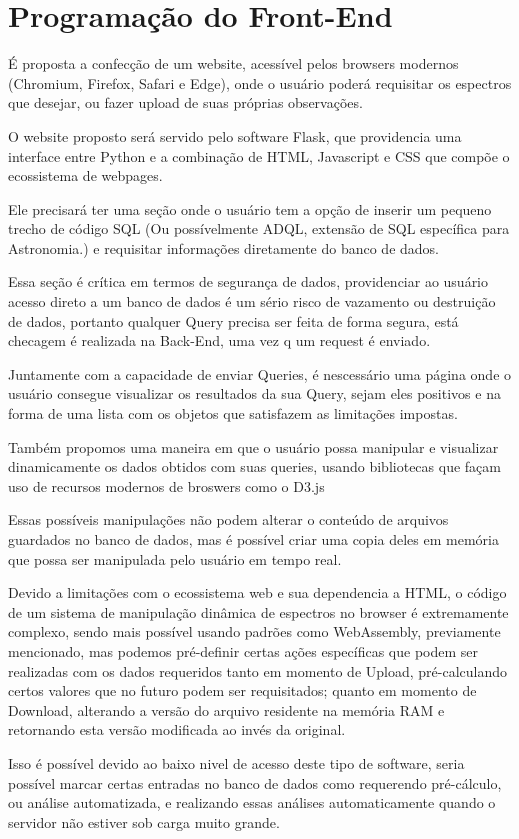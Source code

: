 \section{Programação do Front-End}

É proposta a confecção de um website, acessível pelos browsers modernos (Chromium, Firefox, Safari e Edge), onde o usuário poderá requisitar os espectros que desejar, ou fazer upload de suas próprias observações.

O website proposto será servido pelo software Flask, que providencia uma interface entre Python e a combinação de HTML, Javascript e CSS que compõe o ecossistema de webpages.

Ele precisará ter uma seção onde o usuário tem a opção de inserir um pequeno trecho de código SQL (Ou possívelmente ADQL, extensão de SQL específica para Astronomia.) e requisitar informações diretamente do banco de dados.

Essa seção é crítica em termos de segurança de dados, providenciar ao usuário acesso direto a um banco de dados é um sério risco de vazamento ou destruição de dados, portanto qualquer Query precisa ser feita de forma segura, está checagem é realizada na Back-End, uma vez q um request é enviado.

Juntamente com a capacidade de enviar Queries, é nescessário uma página onde o usuário consegue visualizar os resultados da sua Query, sejam eles positivos e na forma de uma lista com os objetos que satisfazem as limitações impostas.

Também propomos uma maneira em que o usuário possa manipular e visualizar dinamicamente os dados obtidos com suas queries, usando bibliotecas que façam uso de recursos modernos de broswers como o D3.js

Essas possíveis manipulações não podem alterar o conteúdo de arquivos guardados no banco de dados, mas é possível criar uma copia deles em memória que possa ser manipulada pelo usuário em tempo real.

Devido a limitações com o ecossistema web e sua dependencia a HTML, o código de um sistema de manipulação dinâmica de espectros no browser é extremamente complexo, sendo mais possível usando padrões como WebAssembly, previamente mencionado, mas podemos pré-definir certas ações específicas que podem ser realizadas com os dados requeridos tanto em momento de Upload, pré-calculando certos valores que no futuro podem ser requisitados; quanto em momento de Download, alterando a versão do arquivo residente na memória RAM e retornando esta versão modificada ao invés da original.

Isso é possível devido ao baixo nivel de acesso deste tipo de software, seria possível marcar certas entradas no banco de dados como requerendo pré-cálculo, ou análise automatizada, e realizando essas análises automaticamente quando o servidor não estiver sob carga muito grande.